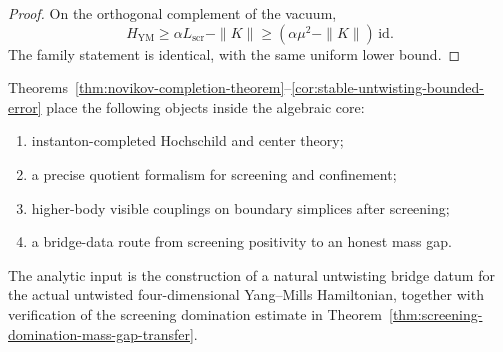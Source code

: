 \begin{proof}
On the orthogonal complement of the vacuum,
\[
H_{\mathrm{YM}}\ge \alpha L_{\mathrm{scr}}-\|K\| \ge (\alpha\mu^2-\|K\|)\,\mathrm{id}.
\]
The family statement is identical, with the same uniform lower bound.
\end{proof}

\begin{remark}
\label{rem:what-is-proved-what-remains-inst}
Theorems~\ref{thm:novikov-completion-theorem}--\ref{cor:stable-untwisting-bounded-error} place the
following objects inside the algebraic core:
\begin{enumerate}[label=(\roman*)]
\item instanton-completed Hochschild and center theory;
\item a precise quotient formalism for screening and confinement;
\item higher-body visible couplings on boundary simplices after screening;
\item a bridge-data route from screening positivity to an honest mass gap.
\end{enumerate}
The analytic input is the construction of a natural untwisting bridge datum for the actual untwisted
four-dimensional Yang--Mills Hamiltonian, together with verification of the screening domination estimate
in Theorem~\ref{thm:screening-domination-mass-gap-transfer}.
\end{remark}
